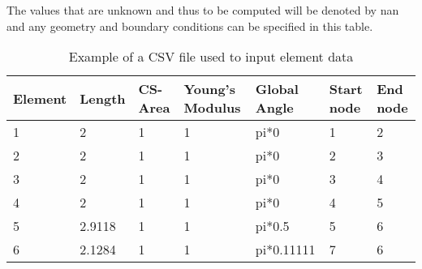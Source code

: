 The values that are unknown and thus to be computed will be denoted by nan and any geometry and boundary conditions can be specified in this table.

\begin{table}[h!]
	\centering
	\begin{tabular}{|l|l|l|l|l|l|l|}
		\hline
		Element & Length & CS-Area & Young's Modulus & Global Angle & Start node & End node \\
		\hline
		1               & 2      & 1                    & 1              & pi*0         & 1             & 2           \\
		2               & 2      & 1                    & 1              & pi*0         & 2             & 3           \\
		3               & 2      & 1                    & 1              & pi*0         & 3             & 4           \\
		4               & 2      & 1                    & 1              & pi*0         & 4             & 5           \\
		5               & 2.9118 & 1                    & 1              & pi*0.5       & 5             & 6           \\
		6               & 2.1284 & 1                    & 1              & pi*0.11111   & 7             & 6           \\
     	\hline
	\end{tabular}
	\caption{Example of a CSV file used to input element data}
	\label{element_csv_table}
\end{table}

